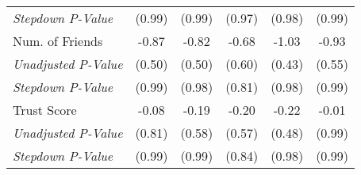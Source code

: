 \begin{tabular}{l c c c c c}
\quad \textit{Stepdown P-Value} & (0.99) & (0.99) & (0.97) & (0.98) & (0.99) \\
Num. of Friends & -0.87 & -0.82 & -0.68 & -1.03 & -0.93 \\
\quad \textit{Unadjusted P-Value} & (0.50) & (0.50) & (0.60) & (0.43) & (0.55) \\
\quad \textit{Stepdown P-Value} & (0.99) & (0.98) & (0.81) & (0.98) & (0.99) \\
Trust Score & -0.08 & -0.19 & -0.20 & -0.22 & -0.01 \\
\quad \textit{Unadjusted P-Value} & (0.81) & (0.58) & (0.57) & (0.48) & (0.99) \\
\quad \textit{Stepdown P-Value} & (0.99) & (0.99) & (0.84) & (0.98) & (0.99) \\
\bottomrule
\end{tabular}
